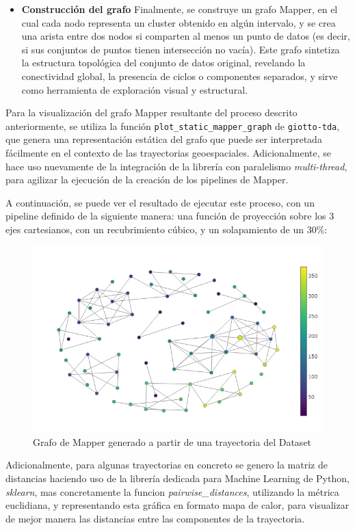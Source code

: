 \begin{itemize}
    \item \textbf{Construcción del grafo} Finalmente, se construye un grafo Mapper, en el cual cada nodo representa un cluster obtenido en algún intervalo, y se crea una arista entre dos nodos si comparten al menos un punto de datos (es decir, si sus conjuntos de puntos tienen intersección no vacía). Este grafo sintetiza la estructura topológica del conjunto de datos original, revelando la conectividad global, la presencia de ciclos o componentes separados, y sirve como herramienta de exploración visual y estructural. 
\end{itemize}

Para la visualización del grafo Mapper resultante del proceso descrito anteriormente, se utiliza la función \texttt{plot\_static\_mapper\_graph} de \texttt{giotto-tda}, que genera una representación estática del grafo que puede ser interpretada fácilmente en el contexto de las trayectorias geoespaciales. Adicionalmente, se hace uso nuevamente de la integración de la librería con paralelismo \textit{multi-thread}, para agilizar la ejecución de la creación de los pipelines de Mapper.

A continuación, se puede ver el resultado de ejecutar este proceso, con un pipeline definido de la siguiente manera: una función de proyección sobre los 3 ejes cartesianos, con un recubrimiento cúbico, y un solapamiento de un 30\%:

\begin{figure}
    \centering
    \includegraphics[scale=0.7]{images/mapper.png}
    \caption{Grafo de Mapper generado a partir de una trayectoria del Dataset}
    \label{fig:grafo_mapper}
\end{figure}


\vspace{20cm}
Adicionalmente, para algunas trayectorias en concreto se genero la matriz de distancias haciendo uso de la librería dedicada para Machine Learning de Python, \textit{sklearn}, mas concretamente la funcion \textit{pairwise\_distances}, utilizando la métrica euclidiana, y representando esta gráfica en formato mapa de calor, para visualizar de mejor manera las distancias entre las componentes de la trayectoria.

